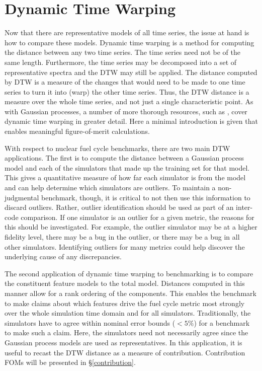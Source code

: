 \clearpage
\section{Dynamic Time Warping}
\label{dtw}

Now that there are representative models of all time series, the issue at hand is
how to compare these models. Dynamic time warping
is a method for computing the distance between any two time series. The time 
series need not be of the same length.  Furthermore, the time series may be 
decomposed into a set of representative spectra and the DTW may still be applied.
The distance computed by DTW is a measure of the changes that would need to be 
made to one time series to turn it into (warp) the other time series. Thus, 
the DTW distance is a measure over the whole time series, and not just a 
single characteristic point. As with Gaussian processes, a number of more thorough
resources, such as \cite{muller}, cover dynamic time warping in greater detail.
Here a minimal introduction is given that enables meaningful figure-of-merit 
calculations.

With respect to nuclear fuel cycle benchmarks, there are two main DTW applications.
The first is to compute the distance between a Gaussian process model and each of 
the simulators that made up the training set for that model. This gives a 
quantitative measure 
of how far each simulator is from the model and can help determine which 
simulators are outliers. To maintain a non-judgmental benchmark, though, it is 
critical to not then use this information to discard outliers.  Rather, outlier
identification should be used as part of an inter-code comparison. If one simulator
is an outlier for a given metric, the reasons for this should be investigated. 
For example, the outlier simulator may be at a higher fidelity level, there may be 
a bug in the outlier, or there may be a bug in all other simulators. Identifying 
outliers for many metrics could help discover the underlying cause of any 
discrepancies.

The second application of dynamic time warping to benchmarking is to compare 
the constituent 
feature models to the total model.  Distances computed in this manner allow 
for a rank ordering of the components.  This enables the benchmark to make claims
about which features drive the fuel cycle metric most strongly over the whole 
simulation time domain and for all simulators. Traditionally, the simulators have 
to agree
within nominal error bounds ($<5\%$) for a benchmark to make such a claim.  Here,
the simulators need not necessarily agree since the Gaussian process models are
used as representatives.  In this application, it is useful to recast the DTW 
distance as a measure of contribution.  Contribution FOMs will be presented in 
\S\ref{contribution}.


